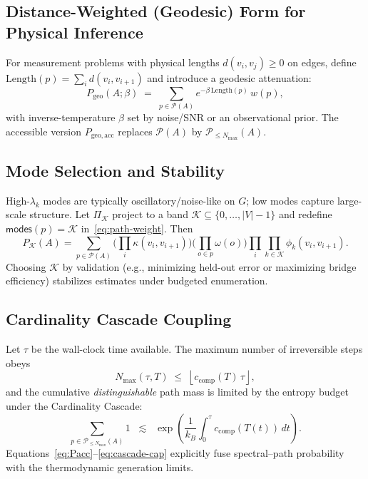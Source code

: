 \documentclass{article}
\begin{document}
\subsection{Distance-Weighted (Geodesic) Form for Physical Inference}
\label{subsec:geodesic-form}
For measurement problems with physical lengths $d(v_i,v_j)\ge 0$ on edges, define
$\mathrm{Length}(p)=\sum_i d(v_i,v_{i+1})$ and introduce a geodesic attenuation:
\begin{equation}
P_{\mathrm{geo}}(A;\beta)
\;=\;
\sum_{p\in\mathcal{P}(A)} e^{-\beta\,\mathrm{Length}(p)}\, w(p),
\label{eq:Pgeo}
\end{equation}
with inverse-temperature $\beta$ set by noise/SNR or an observational prior. The accessible
version $P_{\mathrm{geo,acc}}$ replaces $\mathcal{P}(A)$ by $\mathcal{P}_{\le N_{\max}}(A)$.
\subsection{Mode Selection and Stability}
\label{subsec:mode-selection}
High-$\lambda_k$ modes are typically oscillatory/noise-like on $G$; low modes capture large-scale structure.
Let $\Pi_{\mathcal{K}}$ project to a band $\mathcal{K}\subseteq\{0,\dots,|V|-1\}$ and redefine
$\mathsf{modes}(p)=\mathcal{K}$ in~\eqref{eq:path-weight}. Then
\begin{equation}
P_{\mathcal{K}}(A)
=
\sum_{p\in\mathcal{P}(A)}
\Bigg(\prod_{i}\kappa(v_i,v_{i+1})\Bigg)
\Bigg(\prod_{o\in p}\omega(o)\Bigg)
\prod_{i}\prod_{k\in\mathcal{K}} \phi_k(v_i,v_{i+1}).
\label{eq:bandpass-P}
\end{equation}
Choosing $\mathcal{K}$ by validation (e.g., minimizing held-out error or maximizing bridge efficiency)
stabilizes estimates under budgeted enumeration.
\subsection{Cardinality Cascade Coupling}
\label{subsec:cardinality-cascade-coupling}
Let $\tau$ be the wall-clock time available. The maximum number of irreversible steps obeys
\begin{equation}
N_{\max}(\tau,T) \;\le\; \left\lfloor c_{\mathrm{comp}}(T)\,\tau \right\rfloor,
\label{eq:Nmax-time}
\end{equation}
and the cumulative \emph{distinguishable} path mass is limited by the entropy budget
under the Cardinality Cascade:
\begin{equation}
\sum_{p\in\mathcal{P}_{\le N_{\max}}(A)} 1
\;\;\lesssim\;\;
\exp\!\left(\frac{1}{k_B}\int_0^\tau c_{\mathrm{comp}}(T(t))\,dt\right).
\label{eq:cascade-cap}
\end{equation}
Equations~\eqref{eq:Pacc}–\eqref{eq:cascade-cap} explicitly fuse spectral–path probability with the
thermodynamic generation limits.
\end{document}
